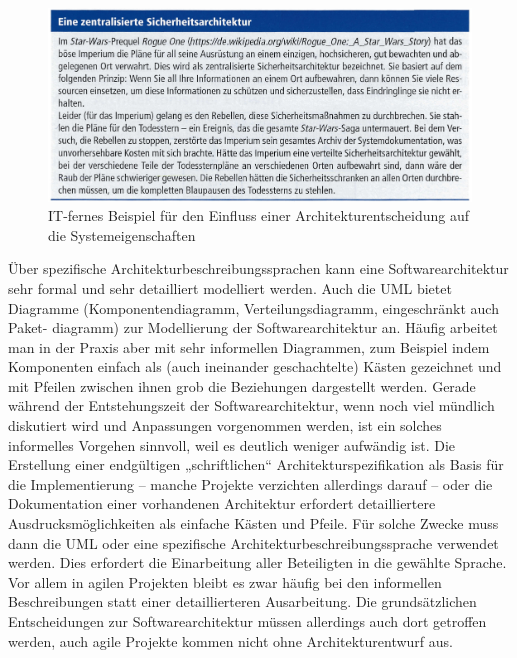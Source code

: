 \vspace{2mm} %

\begin{figure}[h!]
	\centering
	\includegraphics[width=\textwidth]{Bilder/Kapitel-7/einfluss_architekturentscheidung.png}
	\caption[IT-fernes Beispiel für den Einfluss einer Architekturentscheidung auf die Systemeigenschaften]{IT-fernes Beispiel für den Einfluss einer Architekturentscheidung auf die Systemeigenschaften \cite[97]{som20}}
	\label{fig:einfluss_architekturentscheidung}
\end{figure}


Über spezifische Architekturbeschreibungssprachen kann eine Softwarearchitektur sehr formal und sehr detailliert modelliert werden. Auch die UML bietet Diagramme (Komponentendiagramm, Verteilungsdiagramm, eingeschränkt auch Paket-
\linebreak %
diagramm) zur Modellierung der Softwarearchitektur an. Häufig arbeitet man in der Praxis aber mit sehr informellen Diagrammen, zum Beispiel indem Komponenten einfach als (auch ineinander geschachtelte) Kästen gezeichnet und mit Pfeilen zwischen ihnen grob die Beziehungen dargestellt werden. Gerade während der Entstehungszeit der Softwarearchitektur, wenn noch viel mündlich diskutiert wird und Anpassungen vorgenommen werden, ist ein solches informelles Vorgehen sinnvoll, weil es deutlich weniger aufwändig ist. Die Erstellung einer endgültigen „schriftlichen“ Architekturspezifikation als Basis für die Implementierung – manche Projekte verzichten allerdings darauf – oder die Dokumentation einer vorhandenen Architektur erfordert detailliertere Ausdrucksmöglichkeiten als einfache Kästen und Pfeile. Für solche Zwecke muss dann die UML oder eine spezifische Architekturbeschreibungssprache verwendet werden. Dies erfordert die Einarbeitung aller Beteiligten in die gewählte Sprache. Vor allem in agilen Projekten bleibt es zwar häufig bei den informellen Beschreibungen statt einer detaillierteren Ausarbeitung. Die grundsätzlichen Entscheidungen zur Softwarearchitektur müssen allerdings auch dort getroffen werden, auch agile Projekte kommen nicht ohne Architekturentwurf aus.